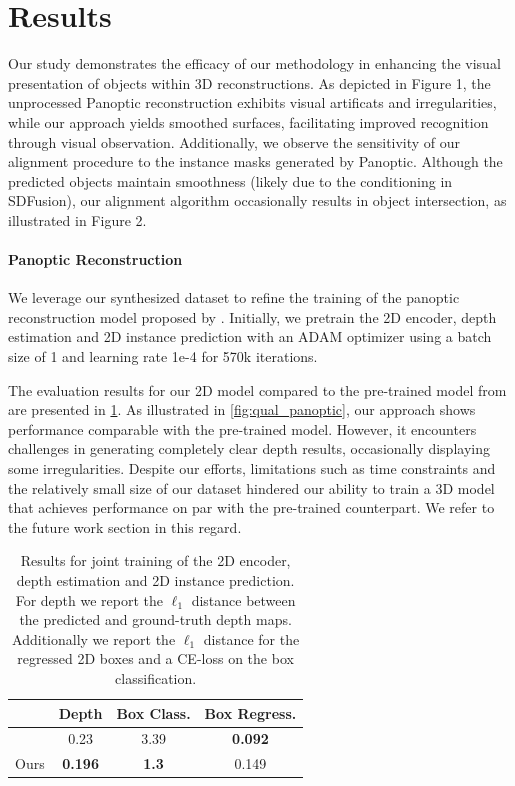 \section{Results}
\label{sec:results}
Our study demonstrates the efficacy of our methodology in enhancing the visual presentation of objects within 3D reconstructions. As depicted in Figure 1, the unprocessed Panoptic reconstruction exhibits visual artificats and irregularities, while our approach yields smoothed surfaces, facilitating improved recognition through visual observation. Additionally, we observe the sensitivity of our alignment procedure to the instance masks generated by Panoptic. Although the predicted objects maintain smoothness (likely due to the conditioning in SDFusion), our alignment algorithm occasionally results in object intersection, as illustrated in Figure 2.

\paragraph{Panoptic Reconstruction}

We leverage our synthesized dataset to refine the training of the panoptic reconstruction model proposed by \citet{dahnert2021panoptic}.
Initially, we pretrain the 2D encoder, depth estimation and 2D instance prediction with an ADAM optimizer using a batch size of 1 and learning rate 1e-4 for 570k iterations.

The evaluation results for our 2D model compared to the pre-trained model from \citet{dahnert2021panoptic} are presented in \cref{tab:2dresults}.
As illustrated in \cref{fig:qual_panoptic}, our approach shows performance comparable with the pre-trained model. However, it encounters challenges in generating completely clear depth results, occasionally displaying some irregularities.
Despite our efforts, limitations such as time constraints and the relatively small size of our dataset hindered our ability to train a 3D model that achieves performance on par with the pre-trained counterpart. We refer to the future work section in this regard.
\begin{table}
  \centering
  \begin{tabular}{@{}lccc@{}}
    \toprule
     & Depth & Box Class. & Box Regress. \\
    \midrule
    \citet{dahnert2021panoptic} & 0.23 & 3.39 & \textbf{0.092}\\
    Ours & \textbf{0.196} & \textbf{1.3} & 0.149 \\
    \bottomrule
  \end{tabular}
  \caption{Results for joint training of the 2D encoder, depth estimation and 2D instance prediction. For depth we report the $\ell_1$ distance between the predicted and ground-truth depth maps. Additionally we report the $\ell_1$ distance for the regressed 2D boxes and a CE-loss on the box classification.  }
  \label{tab:2dresults}
\end{table}

